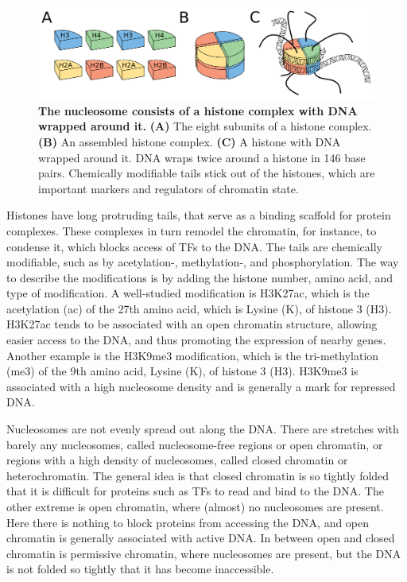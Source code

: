 \begin{figure}
    \center
    \includegraphics[width=0.8\linewidth]{ch.introduction/imgs/histones.png}
    \caption{\textbf{The nucleosome consists of a histone complex with DNA wrapped around it.} \textbf{(A)} The eight subunits of a histone complex. \textbf{(B)} An assembled histone complex. \textbf{(C)} A histone with DNA wrapped around it. DNA wraps twice around a histone in 146 base pairs. Chemically modifiable tails stick out of the histones, which are important markers and regulators of chromatin state.}
    \label{fig:histones}
\end{figure}

Histones have long protruding tails, that serve as a binding scaffold for protein complexes. These complexes in turn remodel the chromatin, for instance, to condense it, which blocks access of TFs to the DNA. The tails are chemically modifiable, such as by acetylation-, methylation-, and phosphorylation. The way to describe the modifications is by adding the histone number, amino acid, and type of modification. A well-studied modification is H3K27ac, which is the acetylation (ac) of the 27th amino acid, which is Lysine (K), of histone 3 (H3). H3K27ac tends to be associated with an open chromatin structure, allowing easier access to the DNA, and thus promoting the expression of nearby genes\cite{Creyghton2010}. Another example is the H3K9me3 modification, which is the tri-methylation (me3) of the 9th amino acid, Lysine (K), of histone 3 (H3). H3K9me3 is associated with a high nucleosome density and is generally a mark for repressed DNA\cite{Barski2007}.

Nucleosomes are not evenly spread out along the DNA. There are stretches with barely any nucleosomes, called nucleosome-free regions or open chromatin, or regions with a high density of nucleosomes, called closed chromatin or heterochromatin. The general idea is that closed chromatin is so tightly folded that it is difficult for proteins such as TFs to read and bind to the DNA. The other extreme is open chromatin, where (almost) no nucleosomes are present. Here there is nothing to block proteins from accessing the DNA, and open chromatin is generally associated with active DNA\cite{Klemm2019}. In between open and closed chromatin is permissive chromatin, where nucleosomes are present, but the DNA is not folded so tightly that it has become inaccessible. 

